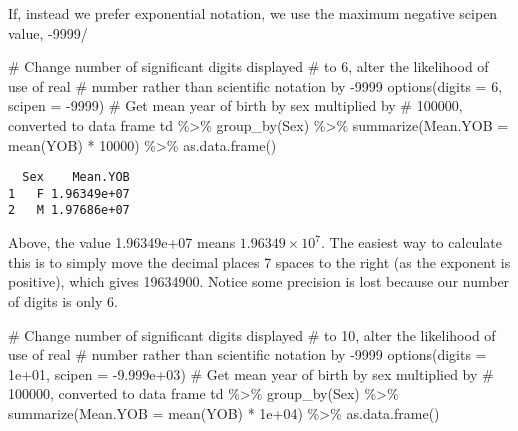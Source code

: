 \documentclass[
  12pt,
  letterpaper]{article}
\newenvironment{Shaded}{\begin{snugshade}}{\end{snugshade}}
\newcommand{\AttributeTok}[1]{\textcolor[rgb]{0.40,0.45,0.13}{#1}}
\newcommand{\CommentTok}[1]{\textcolor[rgb]{0.37,0.37,0.37}{#1}}
\newcommand{\DecValTok}[1]{\textcolor[rgb]{0.68,0.00,0.00}{#1}}
\newcommand{\FloatTok}[1]{\textcolor[rgb]{0.68,0.00,0.00}{#1}}
\newcommand{\FunctionTok}[1]{\textcolor[rgb]{0.28,0.35,0.67}{#1}}
\newcommand{\NormalTok}[1]{\textcolor[rgb]{0.00,0.23,0.31}{#1}}
\newcommand{\SpecialCharTok}[1]{\textcolor[rgb]{0.37,0.37,0.37}{#1}}
\renewcommand\texttt[1]{{\ttfamily\color{BrickRed}#1}}
\begin{document}
If, instead we prefer exponential notation, we use the maximum negative
\texttt{scipen} value, -9999/

\begin{Shaded}
\begin{Highlighting}[]
\CommentTok{\# Change number of significant digits displayed}
\CommentTok{\# to 6, alter the likelihood of use of real}
\CommentTok{\# number rather than scientific notation by {-}9999}
\FunctionTok{options}\NormalTok{(}\AttributeTok{digits =} \DecValTok{6}\NormalTok{, }\AttributeTok{scipen =} \SpecialCharTok{{-}}\DecValTok{9999}\NormalTok{)}
\CommentTok{\# Get mean year of birth by sex multiplied by}
\CommentTok{\# 100000, converted to data frame}
\NormalTok{td }\SpecialCharTok{\%\textgreater{}\%}
    \FunctionTok{group\_by}\NormalTok{(Sex) }\SpecialCharTok{\%\textgreater{}\%}
    \FunctionTok{summarize}\NormalTok{(}\AttributeTok{Mean.YOB =} \FunctionTok{mean}\NormalTok{(YOB) }\SpecialCharTok{*} \DecValTok{10000}\NormalTok{) }\SpecialCharTok{\%\textgreater{}\%}
    \FunctionTok{as.data.frame}\NormalTok{()}
\end{Highlighting}
\end{Shaded}

\begin{verbatim}
  Sex    Mean.YOB
1   F 1.96349e+07
2   M 1.97686e+07
\end{verbatim}

Above, the value \texttt{1.96349e+07} means \(1.96349 \times 10^7\). The
easiest way to calculate this is to simply move the decimal places 7
spaces to the right (as the exponent is positive), which gives
\texttt{19634900}. Notice some precision is lost because our number of
\texttt{digits} is only 6.

\begin{Shaded}
\begin{Highlighting}[]
\CommentTok{\# Change number of significant digits displayed}
\CommentTok{\# to 10, alter the likelihood of use of real}
\CommentTok{\# number rather than scientific notation by {-}9999}
\FunctionTok{options}\NormalTok{(}\AttributeTok{digits =} \FloatTok{1e+01}\NormalTok{, }\AttributeTok{scipen =} \SpecialCharTok{{-}}\FloatTok{9.999e+03}\NormalTok{)}
\CommentTok{\# Get mean year of birth by sex multiplied by}
\CommentTok{\# 100000, converted to data frame}
\NormalTok{td }\SpecialCharTok{\%\textgreater{}\%}
    \FunctionTok{group\_by}\NormalTok{(Sex) }\SpecialCharTok{\%\textgreater{}\%}
    \FunctionTok{summarize}\NormalTok{(}\AttributeTok{Mean.YOB =} \FunctionTok{mean}\NormalTok{(YOB) }\SpecialCharTok{*} \FloatTok{1e+04}\NormalTok{) }\SpecialCharTok{\%\textgreater{}\%}
    \FunctionTok{as.data.frame}\NormalTok{()}
\end{Highlighting}
\end{Shaded}
\end{document}
